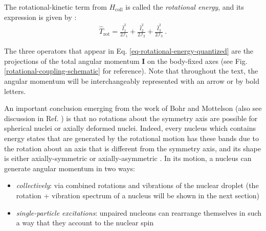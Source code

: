 The rotational-kinetic term from $H_\text{coll}$ is called the \emph{rotational energy}, and its expression is given by \cite{corrigan1976exact}:
\begin{align}
    \hat{T}_\text{rot}=\frac{\hat{I}_1^2}{2\mathcal{I}_1}+\frac{\hat{I}_2^2}{2\mathcal{I}_2}+\frac{\hat{I}_3^2}{2\mathcal{I}_3}\ .
    \label{eq-rotational-energy-quantized}
\end{align}

The three operators that appear in Eq. \ref{eq-rotational-energy-quantized} are the projections of the total angular momentum $\mathbf{I}$ on the body-fixed axes (see Fig. \ref{rotational-coupling-schematic} for reference). Note that throughout the text, the angular momentum will be interchangeably represented with an arrow or by bold letters.

An important conclusion emerging from the work of Bohr and Mottelson \cite{bohr1954rotational} (also see discussion in Ref. \cite{greiner1996nuclear}) is that no rotations about the symmetry axis are possible for spherical nuclei or axially deformed nuclei. 
Indeed, every nucleus which contains energy states that are generated by the rotational motion has these bands due to the rotation about an axis that is different from the symmetry axis, and its shape is either axially-symmetric or axially-asymmetric \cite{hamamoto2016interplay}. In its motion, a nucleus can generate angular momentum in two ways:
\begin{itemize}
    \item \emph{collectively}: via combined rotations and vibrations of the nuclear droplet (the rotation + vibration spectrum of a nucleus will be shown in the next section)
    \item \emph{single-particle excitations}: unpaired nucleons can rearrange themselves in such a way that they account to the nuclear spin
\end{itemize}


